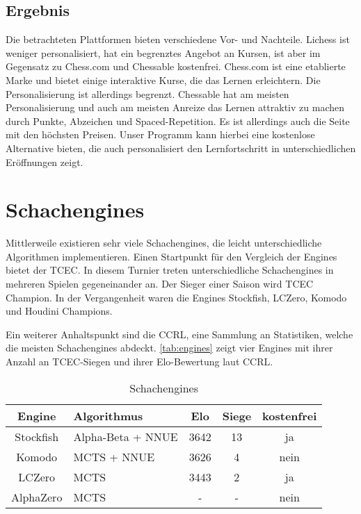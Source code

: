 \subsection{Ergebnis}
Die betrachteten Plattformen bieten verschiedene Vor- und Nachteile. Lichess ist weniger personalisiert, hat ein begrenztes Angebot an Kursen, ist aber im Gegensatz zu Chess.com und Chessable kostenfrei. Chess.com ist eine etablierte Marke und bietet einige interaktive Kurse, die das Lernen erleichtern. Die Personalisierung ist allerdings begrenzt. Chessable hat am meisten Personalisierung und auch am meisten Anreize das Lernen attraktiv zu machen durch Punkte, Abzeichen und Spaced-Repetition. Es ist allerdings auch die Seite mit den höchsten Preisen.
Unser Programm kann hierbei eine kostenlose Alternative bieten, die auch personalisiert den Lernfortschritt in unterschiedlichen Eröffnungen zeigt.

\section{Schachengines}
Mittlerweile existieren sehr viele Schachengines, die leicht unterschiedliche Algorithmen implementieren.
Einen Startpunkt für den Vergleich der Engines bietet der \ac{TCEC}. In diesem Turnier treten unterschiedliche Schachengines in mehreren Spielen gegeneinander an. Der Sieger einer Saison wird  \ac{TCEC} Champion. In der Vergangenheit waren die Engines Stockfish, LCZero, Komodo und Houdini Champions. \cite{tcec_chessdom_tcec-chess_2025}

Ein weiterer Anhaltspunkt sind die \acf{CCRL}, eine Sammlung an Statistiken, welche die meisten Schachengines abdeckt. \cite{ccrl_team_ccrl_2025}
\autoref{tab:engines} zeigt vier Engines mit ihrer Anzahl an \ac{TCEC}-Siegen und ihrer Elo-Bewertung laut \ac{CCRL}.

\begin{table}[h]
    \centering
    \begin{tabular}{|c|l|c|c|c|}
        \hline
        Engine & Algorithmus & Elo & Siege & kostenfrei \\
        \hline
        Stockfish & Alpha-Beta + \acs{NNUE} & 3642 & 13 & ja \\
        \hline
        Komodo & \acs{MCTS} + \acs{NNUE} & 3626 & 4 & nein \\
        \hline
        LCZero & \acs{MCTS} & 3443 & 2 & ja \\
        \hline
        AlphaZero & \acs{MCTS} & - & - & nein \\
        \hline
    \end{tabular}
    \caption{Schachengines}
    \label{tab:engines}
\end{table}

